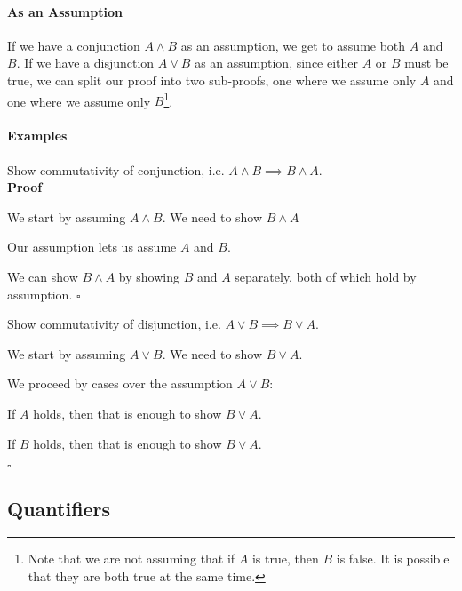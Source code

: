 \documentclass{tufte-handout}
\begin{document}
\paragraph{As an Assumption}
If we have a conjunction $A \land B$ as an assumption, we get to
assume both $A$ and $B$. If we have a disjunction $A \lor B$ as an
assumption, since either $A$ or $B$ must be true, we can split our
proof into two sub-proofs, one where we assume only $A$ and one
where we assume only $B$\footnote{Note that we are not assuming
  that if $A$ is true, then $B$ is false. It is possible that they
  are both true at the same time. }.


\paragraph{Examples}

\begin{itemize}
\item Show commutativity of conjunction, i.e. $A \land B \implies B \land A$.\\
  \textbf{Proof}
  \begin{compactenum}
  \item We start by assuming $A \land B$. We need to show $B \land A$
  \item Our assumption lets us assume $A$ and $B$.
  \item We can show $B \land A$ by showing $B$ and $A$ separately,
    both of which hold by assumption. $\square$
  \end{compactenum}
\item Show commutativity of disjunction, i.e. $A \lor B \implies B \lor A$.\\
  \begin{compactenum}
  \item We start by assuming $A \lor B$. We need to show $B \lor A$.
  \item We proceed by cases over the assumption $A \lor B$:
    \begin{compactenum}
    \item If $A$ holds, then that is enough to show $B \lor A$.
    \item If $B$ holds, then that is enough to show $B \lor A$.
    \end{compactenum}
  \end{compactenum}
  $\square$
\end{itemize}

\subsection{Quantifiers}
\end{document}
